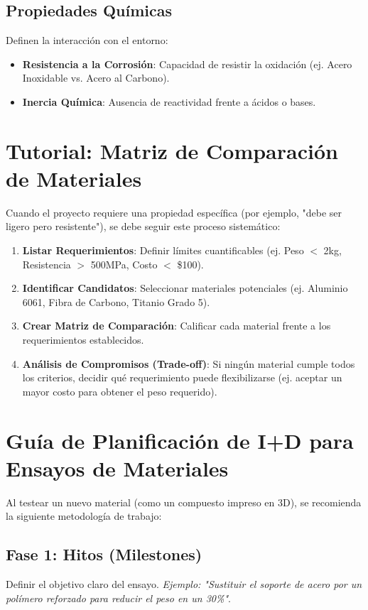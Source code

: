 \documentclass[../main]{subfiles}
\begin{document}
\subsection{Propiedades Químicas}
Definen la interacción con el entorno:
\begin{itemize}
  \item \textbf{Resistencia a la Corrosión}: Capacidad de resistir la oxidación (ej. Acero Inoxidable vs. Acero al Carbono).
  \item \textbf{Inercia Química}: Ausencia de reactividad frente a ácidos o bases.
\end{itemize}

\section{Tutorial: Matriz de Comparación de Materiales}
Cuando el proyecto requiere una propiedad específica (por ejemplo, "debe ser ligero pero resistente"), se debe seguir este proceso sistemático:

\begin{enumerate}
  \item \textbf{Listar Requerimientos}: Definir límites cuantificables (ej. Peso $<$ 2kg, Resistencia $>$ 500MPa, Costo $<$ \$100).
  \item \textbf{Identificar Candidatos}: Seleccionar materiales potenciales (ej. Aluminio 6061, Fibra de Carbono, Titanio Grado 5).
  \item \textbf{Crear Matriz de Comparación}: Calificar cada material frente a los requerimientos establecidos.
  \item \textbf{Análisis de Compromisos (Trade-off)}: Si ningún material cumple todos los criterios, decidir qué requerimiento puede flexibilizarse (ej. aceptar un mayor costo para obtener el peso requerido).
\end{enumerate}

\section{Guía de Planificación de I+D para Ensayos de Materiales}
Al testear un nuevo material (como un compuesto impreso en 3D), se recomienda la siguiente metodología de trabajo:

\subsection{Fase 1: Hitos (Milestones)}
Definir el objetivo claro del ensayo. \textit{Ejemplo: "Sustituir el soporte de acero por un polímero reforzado para reducir el peso en un 30\%"}.
\end{document}
